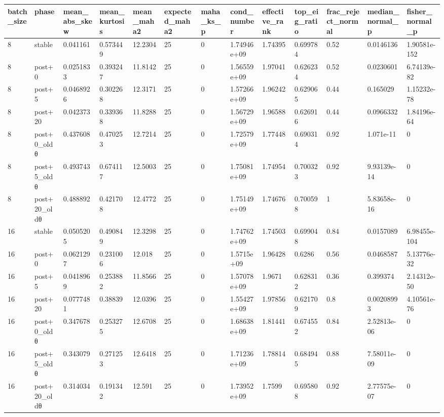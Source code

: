 \begin{tabular}{lllllllllllll}
\hline
batch\_size & phase & mean\_abs\_skew & mean\_kurtosis & mean\_maha2 & expected\_maha2 & maha\_ks\_p & cond\_number & effective\_rank & top\_eig\_ratio & frac\_reject\_normal & median\_normal\_p & fisher\_normal\_p \\
\hline
8 & stable & 0.041161 & 0.573449 & 12.2304 & 25 & 0 & 1.74946e+09 & 1.74395 & 0.699784 & 0.52 & 0.0146136 & 1.90581e-152 \\
8 & post+0 & 0.0251833 & 0.393247 & 11.8142 & 25 & 0 & 1.56559e+09 & 1.97041 & 0.626234 & 0.52 & 0.0230601 & 6.74139e-82 \\
8 & post+5 & 0.0468926 & 0.302268 & 12.3171 & 25 & 0 & 1.57266e+09 & 1.96242 & 0.629065 & 0.44 & 0.165029 & 1.15232e-78 \\
8 & post+20 & 0.042373 & 0.339368 & 11.8288 & 25 & 0 & 1.56729e+09 & 1.96588 & 0.626916 & 0.44 & 0.0966332 & 1.84196e-64 \\
8 & post+0\_oldθ & 0.437608 & 0.470253 & 12.7214 & 25 & 0 & 1.72579e+09 & 1.77448 & 0.690314 & 0.92 & 1.071e-11 & 0 \\
8 & post+5\_oldθ & 0.493743 & 0.674117 & 12.5003 & 25 & 0 & 1.75081e+09 & 1.74954 & 0.700323 & 0.92 & 9.93139e-14 & 0 \\
8 & post+20\_oldθ & 0.488892 & 0.421708 & 12.4772 & 25 & 0 & 1.75149e+09 & 1.74676 & 0.700598 & 1 & 5.83658e-16 & 0 \\
16 & stable & 0.0505205 & 0.490849 & 12.3298 & 25 & 0 & 1.74762e+09 & 1.74503 & 0.699048 & 0.84 & 0.0157089 & 6.98455e-104 \\
16 & post+0 & 0.0621297 & 0.231006 & 12.018 & 25 & 0 & 1.5715e+09 & 1.96428 & 0.6286 & 0.56 & 0.0468587 & 5.13776e-32 \\
16 & post+5 & 0.0418969 & 0.253882 & 11.8566 & 25 & 0 & 1.57078e+09 & 1.9671 & 0.628312 & 0.36 & 0.399374 & 2.14312e-50 \\
16 & post+20 & 0.0777481 & 0.38839 & 12.0396 & 25 & 0 & 1.55427e+09 & 1.97856 & 0.621709 & 0.8 & 0.00208993 & 4.10561e-76 \\
16 & post+0\_oldθ & 0.347678 & 0.253275 & 12.6708 & 25 & 0 & 1.68638e+09 & 1.81441 & 0.674552 & 0.84 & 2.52813e-06 & 0 \\
16 & post+5\_oldθ & 0.343079 & 0.271253 & 12.6418 & 25 & 0 & 1.71236e+09 & 1.78814 & 0.684945 & 0.88 & 7.58011e-09 & 0 \\
16 & post+20\_oldθ & 0.314034 & 0.191342 & 12.591 & 25 & 0 & 1.73952e+09 & 1.7599 & 0.695808 & 0.92 & 2.77575e-07 & 0 \\

\end{tabular}
